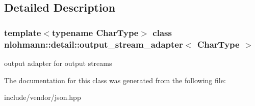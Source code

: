 \subsection{Detailed Description}
\subsubsection*{template$<$typename Char\+Type$>$\newline
class nlohmann\+::detail\+::output\+\_\+stream\+\_\+adapter$<$ Char\+Type $>$}

output adapter for output streams 

The documentation for this class was generated from the following file\+:\begin{DoxyCompactItemize}
\item 
include/vendor/json.\+hpp\end{DoxyCompactItemize}
